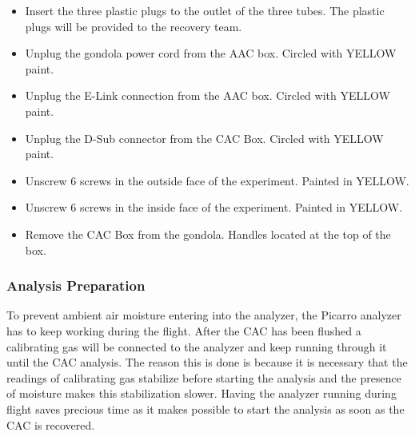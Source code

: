 \documentclass[a4paper,12pt,twoside]{article}
\begin{document}
\label{sec:recovery-checklist}

\begin{itemize}
    \item Insert the three plastic plugs to the outlet of the three tubes. The plastic plugs will be provided to the recovery team. 
    \item Unplug the gondola power cord from the AAC box. Circled with YELLOW paint.
    \item Unplug the E-Link connection from the AAC box. Circled with YELLOW paint.
    \item Unplug the D-Sub connector from the CAC Box. Circled with YELLOW paint.
    \item Unscrew 6 screws in the outside face of the experiment. Painted in YELLOW.
    \item Unscrew 6 screws in the inside face of the experiment. Painted in YELLOW.
    \item Remove the CAC Box from the gondola. Handles located at the top of the box. 
\end{itemize}



\subsubsection{Analysis Preparation}

To prevent ambient air moisture entering into the analyzer, the Picarro analyzer has to keep working during the flight. After the CAC has been flushed a calibrating gas will be connected to the analyzer and keep running through it until the CAC analysis. 
The reason this is done is because it is necessary that the readings of calibrating gas stabilize before starting the analysis and the presence of moisture makes this stabilization slower. Having the analyzer running during flight saves precious time as it makes possible to start the analysis as soon as the CAC is recovered. 



\end{document}
